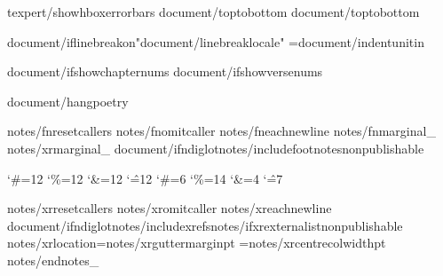 {texpert/showhboxerrorbars}\overfullrule=0pt
{document/toptobottom}     %
{document/toptobottom}\rotatetrue

{document/iflinebreakon}\XeTeXlinebreaklocale "{document/linebreaklocale}"
={document/indentunit}in

{document/ifshowchapternums}\OmitChapterNumbertrue
\def\AfterChapterSpaceFactor{{{texpert/afterchapterspace}}}
{document/ifshowversenums}\def\AfterVerseSpaceFactor{{{texpert/afterversespace}}}
\OmitAllVersesfalse

{document/hangpoetry}\hangpoetry



{notes/fnresetcallers}
{notes/fnomitcaller}
{notes/fneachnewline}
{notes/fnmarginal_}
{notes/xrmarginal_}
{document/ifndiglot}{notes/includefootnotes}\expandafter\def\csname f:properties\endcsname{{nonpublishable}}

\catcode`\#=12 \catcode`\%=12 \catcode`\&=12 \catcode`\^=12
\catcode`\#=6 \catcode`\%=14 \catcode`\&=4 \catcode`\^=7
%

{notes/xrresetcallers}
{notes/xromitcaller}
{notes/xreachnewline}
{document/ifndiglot}{notes/includexrefs}{notes/ifxrexternalist}\expandafter\def\csname x:properties\endcsname{{nonpublishable}}
{notes/xrlocation}\def\XrefNotes{{x}}\XrefNotesMargin={notes/xrguttermargin}pt \XrefNotesWidth={notes/xrcentrecolwidth}pt\def\XrefSide{{{notes/xrcolside}}}
{notes/endnotes_}

